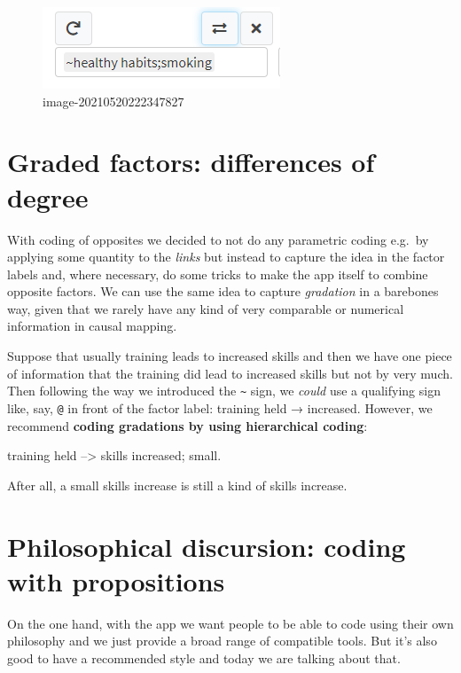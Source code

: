 \documentclass[
]{book}
\begin{document}
\begin{figure}
\centering
\includegraphics{_assets/image-20210520222347827.png}
\caption{image-20210520222347827}
\end{figure}

\hypertarget{graded-factors-differences-of-degree}{%
\section{Graded factors: differences of degree}\label{graded-factors-differences-of-degree}}

With coding of opposites we decided to not do any parametric coding e.g.~by applying some quantity to the \emph{links} but instead to capture the idea in the factor labels and, where necessary, do some tricks to make the app itself to combine opposite factors. We can use the same idea to capture \emph{gradation} in a barebones way, given that we rarely have any kind of very comparable or numerical information in causal mapping.

Suppose that usually training leads to increased skills and then we have one piece of information that the training did lead to increased skills but not by very much. Then following the way we introduced the \texttt{\textasciitilde{}} sign, we \emph{could} use a qualifying sign like, say, \texttt{@} in front of the factor label: training held → \citet{skills} increased. However, we recommend \textbf{coding gradations by using hierarchical coding}:

training held --\textgreater{} skills increased; small.

After all, a small skills increase is still a kind of skills increase.

\hypertarget{philosophical-discursion-coding-with-propositions}{%
\section{Philosophical discursion: coding with propositions}\label{philosophical-discursion-coding-with-propositions}}

On the one hand, with the app we want people to be able to code using their own philosophy and we just provide a broad range of compatible tools. But it's also good to have a recommended style and today we are talking about that.
\end{document}
